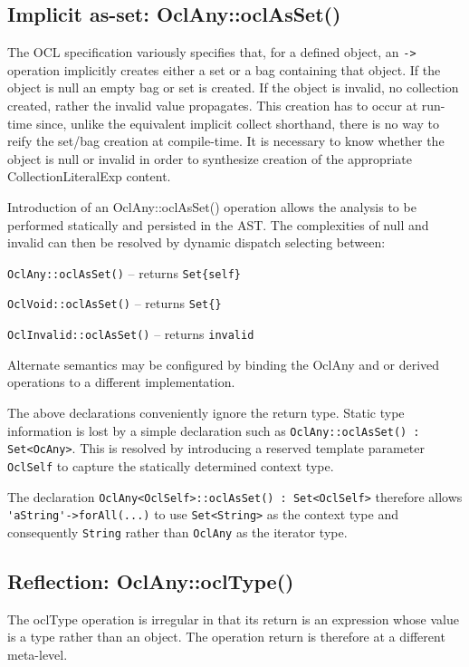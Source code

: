 \documentclass{eceasst}
\begin{document}
\subsection{Implicit as-set: OclAny::oclAsSet()}

The OCL specification variously specifies that, for a defined object,  an \verb|->| operation implicitly creates either a set or a bag containing that object. If the object is null an empty bag or set is created. If the object is invalid, no collection created, rather the invalid value propagates. This creation has to occur at run-time since, unlike the equivalent implicit collect shorthand, there is no way to reify the set/bag creation at compile-time. It is necessary to know whether the object is null or invalid in order to synthesize creation of the appropriate CollectionLiteralExp content.

Introduction of an OclAny::oclAsSet() operation allows the analysis to be performed statically and persisted in the AST. The complexities of null and invalid can then be resolved by dynamic dispatch selecting between:

\verb|OclAny::oclAsSet()| -- returns \verb|Set{self}|

\verb|OclVoid::oclAsSet()| -- returns \verb|Set{}|

\verb|OclInvalid::oclAsSet()| -- returns \verb|invalid|

Alternate semantics may be configured by binding the OclAny and or derived operations to a different implementation.

The above declarations conveniently ignore the return type. Static type information is lost by a simple declaration such as \verb!OclAny::oclAsSet() : Set<OcAny>!. This is resolved by introducing  a reserved template parameter \verb!OclSelf! to capture the statically determined context type.

The declaration \verb!OclAny<OclSelf>::oclAsSet() : Set<OclSelf>! therefore allows \verb|'aString'->forAll(...)| to use \verb|Set<String>| as the context type and consequently \verb|String| rather than \verb|OclAny| as the iterator type.

\subsection{Reflection: OclAny::oclType()}

The oclType operation is irregular in that its return is an expression whose value is a type rather than an object. The operation return is therefore at a different meta-level.
\end{document}

